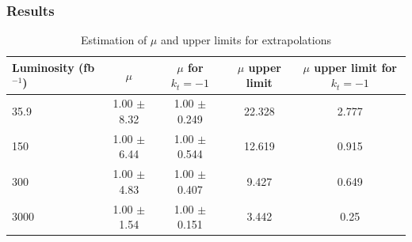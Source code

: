 \documentclass[11pt]{beamer}
\begin{document}
\begin{frame}
\frametitle{Results}
\begin{table}
	\caption*{Estimation of $\mu$ and upper limits  for extrapolations}
\tiny{
	\begin{tabular}{|p{1cm}|c|c|c|c|}
		\hline
		Luminosity (fb$^{-1}$)	&$\mu$ &$\mu$ for $k_t=-1$ &$\mu$ upper limit &$\mu$ upper limit for $k_t=-1$ \\
		\hline
		35.9 & 1.00 $\pm$  8.32 & 1.00 $\pm$  0.249&	22.328 & 2.777   \\
		\hline
		150& 1.00 $\pm$  6.44 & 1.00 $\pm$  0.544  &12.619 &0.915 \\
		\hline
		300&1.00 $\pm$  4.83 &1.00 $\pm$  0.407 & 9.427&0.649 \\
		\hline
		3000&1.00 $\pm$  1.54 & 1.00 $\pm$  0.151&	 3.442 & 0.25
		\\
		\hline
	\end{tabular}
}
\end{table}
\end{frame}
\end{document}

